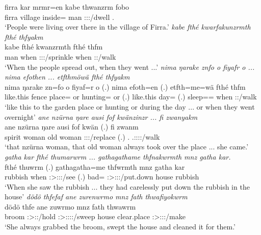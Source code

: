 \begin{exe}
	\gll firra kar mrmr=en kabe thwanzrm fobo\\
	firra village inside=\Loc{} man \Stpl:\Sbj:\Pst:\Dur/dwell \Dist.\All{}\\
	\trans `People were living over there in the village of Firra.'
	\emph{kabe fthé kwarfakunzrmth fthé thfyakm}\\
	\gll kabe fthé kwanzrmth fthé thfm\\
	man when \Stpl:\Sbj:\Pst:\Dur/sprinkle when \Stpl:\Sbj\Pst:\Dur/walk\\
	\trans `When the people spread out, when they went ...'
	\emph{nima ŋarake znfo o fiyafr o ... nima efothen ... etfthmöwä fthé thfyakm}\\
	\gll nima ŋarake zn=fo o fiyaf=r o (.) nima efoth=en (.) etfth=me=wä fthé thfm\\
	{like.this} fence place=\Loc{} or hunting=\Purp{} or (.) {like.this} day=\Loc{} (.) sleep=\Ins=\Emph{} when \Stpl:\Sbj\Pst:\Dur/walk\\
	\trans `like this to the garden place or hunting or during the day ... or when they went overnight'
	\emph{ane nzürna ŋare ausi fof kwänzinzr ... fi zwanyakm}\\
	\gll ane nzürna ŋare ausi fof kwän (.) fi zwanm\\
	\Dem{} spirit woman {old woman} \Emph{} \Stsg:\Sbj:\Iter:\Venit/replace (.) \Third.\Abs{} \Tsg.\F:\Sbj:\Pst:\Dur:\Venit/walk\\
	\trans `that nzürna woman, that old woman always took over the place ... she came.'
	\emph{gatha kar fthé thumarwrm ... gathagathame thfnakwrmth mnz gatha kar.}\\
	 fthé thuwrm (.) {gathagatha}=me thfwrmth mnz {gatha kar}\\
	rubbish when \Stsg:\Sbj>\Stpl:\Obj:\Pst:\Dur/see (.) bad=\Ins{} \Stpl:\Sbj>\Stpl:\Obj:\Pst:\Dur/put.down house rubbish\\
	\trans `When she saw the rubbish ... they had carelessly put down the rubbish in the house'
	\emph{dödö thfefaf ane zurenwrmo mnz fath thwafiyokwrm}\\
	\gll dödö thfe ane zuwrmo mnz fath thwawrm\\
	broom \Stsg:\Sbj>\Stpl:\Obj:\Iter/hold \Dem{} \Stsg:\Sbj>\Tsg:\F:\Pst:\Dur:\Andat/sweep house clear.place \Sg:\Sbj>\Stpl:\Io:\Pst:\Dur/make\\
	\trans `She always grabbed the broom, swept the house and cleaned it for them.'

\end{exe}
